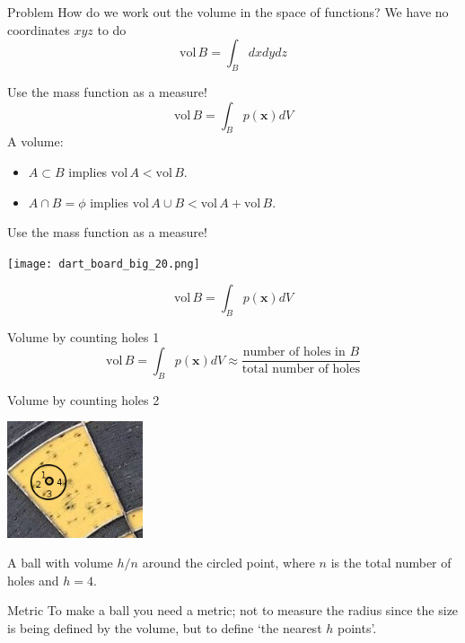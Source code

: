 \documentclass{beamer}
\begin{document}
\begin{frame}{Problem}
\color{black}
How do we work out the volume in the space of functions? We have no coordinates $xyz$ to do
\color{dark}
$$\mbox{vol}\,B=\int_B dxdydz$$
\end{frame}


\begin{frame}{Use the mass function as a measure!}
\color{dark}
$$\mbox{vol}\,B=\int_B p(\mathbf{x}) dV$$
\color{black}
A volume: 
\begin{itemize}
\item $A\subset B$ implies $\mbox{vol}\,A<\mbox{vol}\,B$.
\item $A\cap B=\phi$ implies $\mbox{vol}\,A\cup B<\mbox{vol}\,A+\mbox{vol}\,B$.
\end{itemize}
\end{frame}


\begin{frame}{Use the mass function as a measure!}
\color{reddish}
\begin{center}
\texttt{[image: dart\_board\_big\_20.png]}
\end{center}
\color{dark}
$$\mbox{vol}\,B=\int_B p(\mathbf{x}) dV$$
\color{black}
\end{frame}



\begin{frame}{Volume by counting holes 1}
\color{dark}
$$\mbox{vol}\,B=\int_B p(\mathbf{x}) dV\approx \frac{\mbox{number of holes in }B}{\mbox{total number of holes}}$$
\end{frame}

\begin{frame}{Volume by counting holes 2}
\color{reddish}
\begin{center}
\includegraphics[width=4cm]{dart_board_zoom_ball.png}
\end{center}
\color{black}
A ball with volume $h/n$ around the circled point, where $n$ is the total number of holes and $h=4$.
\end{frame}


\begin{frame}{Metric}
To make a ball you need a metric; not to measure the radius since the
size is being defined by the volume, but to define \lq{}the nearest
$h$ points\rq{}.
\color{reddish}
\begin{center}
\color{reddish}

\end{center}
\end{frame}
\end{document}
